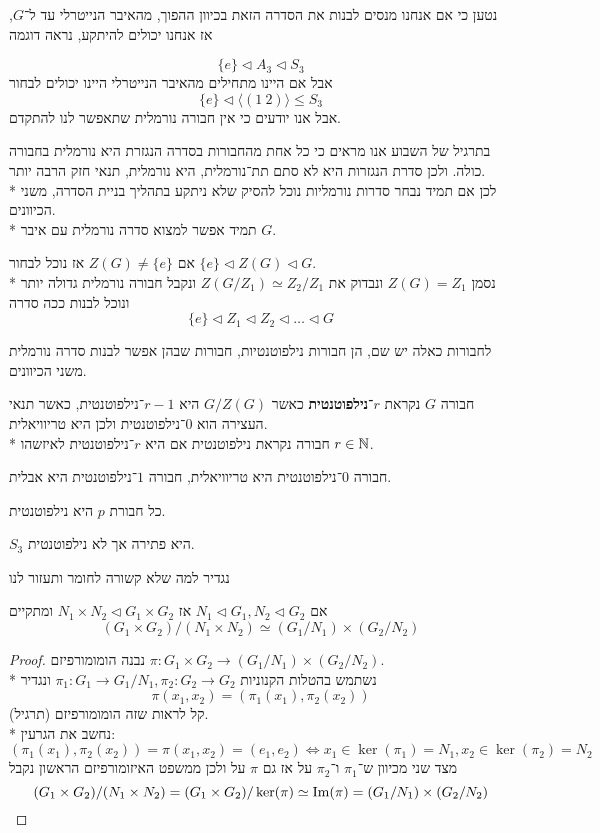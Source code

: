 נטען כי אם אנחנו מנסים לבנות את הסדרה הזאת בכיוון ההפוך, מהאיבר הנייטרלי עד ל־$G$, אז אנחנו יכולים להיתקע, נראה דוגמה
\begin{example}
	\[
		\{ e \} \triangleleft A_3 \triangleleft S_3
	\]
	אבל אם היינו מתחילים מהאיבר הנייטרלי היינו יכולים לבחור
	\[
		\{e\} \triangleleft \langle (1\ 2) \rangle \le S_3
	\]
	אבל אנו יודעים כי אין חבורה נורמלית שתאפשר לנו להתקדם.
\end{example}
בתרגיל של השבוע אנו מראים כי כל אחת מהחבורות בסדרה הנגזרת היא נורמלית בחבורה כולה.
ולכן סדרת הנגזרות היא לא סתם תת־נורמלית, היא נורמלית, תנאי חזק הרבה יותר. \\*
לכן אם תמיד נבחר סדרות נורמליות נוכל להסיק שלא ניתקע בתהליך בניית הסדרה, משני הכיוונים. \\*
תמיד אפשר למצוא סדרה נורמלית עם איבר $G$.
\begin{example}
	אם $Z(G) \ne \{ e \}$ אז נוכל לבחור $\{e\} \triangleleft Z(G) \triangleleft G$. \\*
	נסמן $Z(G) = Z_1$ ונבדוק את $Z(G / Z_1) \simeq Z_2 / Z_1$ ונקבל חבורה נורמלית גדולה יותר ונוכל לבנות ככה סדרה
	\[
		\{e\} \triangleleft Z_1 \triangleleft Z_2 \triangleleft \dots \triangleleft G
	\]
\end{example}
לחבורות כאלה יש שם, הן חבורות נילפוטנטיות, חבורות שבהן אפשר לבנות סדרה נורמלית משני הכיוונים.
\begin{definition}
	חבורה $G$ נקראת \textbf{$r$־נילפוטנטית} כאשר $G / Z(G)$ היא $r - 1$־נילפוטנטית, כאשר תנאי העצירה הוא $0$־נילפוטנטית ולכן היא טריוויאלית. \\*
	חבורה נקראת נילפוטנטית אם היא $r$־נילפוטנטית לאיזשהו $r \in \mathbb{N}$.
\end{definition}
\begin{remark}
	חבורה $0$־נילפוטנטית היא טריוויאלית, חבורה $1$־נילפוטנטית היא אבלית.
\end{remark}
\begin{example}
	כל חבורת $p$ היא נילפוטנטית.
\end{example}
\begin{example}
	$S_3$ היא פתירה אך לא נילפוטנטית.
\end{example}
נגדיר למה שלא קשורה לחומר ותעזור לנו
\begin{lemma}
	אם $N_1 \triangleleft G_1, N_2 \triangleleft G_2$ אז $N_1 \times N_2 \triangleleft G_1 \times G_2$ ומתקיים
	\[
		(G_1 \times G_2) / (N_1 \times N_2) \simeq (G_1 / N_1) \times (G_2 / N_2)
	\]
\end{lemma}
\begin{proof}
	נבנה הומומורפיזם $\pi : G_1 \times G_2 \to (G_1 / N_1) \times (G_2 / N_2)$. \\*
	נשתמש בהטלות הקנוניות $\pi_1 : G_1 \to G_1 / N_1, \pi_2 : G_2 \to G_2$ ונגדיר
	\[
		\pi(x_1, x_2) = ( \pi_1(x_1), \pi_2(x_2) )
	\]
	קל לראות שזה הומומורפיזם (תרגיל). \\*
	נחשב את הגרעין:
	\[
		( \pi_1(x_1), \pi_2(x_2) ) = \pi(x_1, x_2) = (e_1, e_2)
		\iff
		x_1 \in \ker(\pi_1) = N_1,
		x_2 \in \ker(\pi_2) = N_2
	\]
	מצד שני מכיוון ש־$\pi_1$ ו־$\pi_2$ על אז גם $\pi$ על ולכן ממשפט האיזומורפיזם הראשון נקבל
	\[
		(G_1 \times G_2) / (N_1 \times N_2) = (G_1 \times G_2) / \ker(\pi) \simeq \operatorname{Im}(\pi) = (G_1 / N_1) \times (G_2 / N_2)
	\]
\end{proof}
